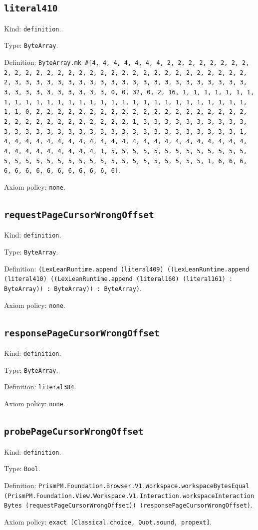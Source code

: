 \documentclass[11pt]{article}
\begin{document}
\subsection*{\texttt{literal410}}
\noindent Kind: \texttt{definition}.\par
\noindent Type: \texttt{ByteArray}.\par
\noindent Definition: \texttt{ByteArray.mk \#[4, 4, 4, 4, 4, 4, 4, 2, 2, 2, 2, 2, 2, 2, 2, 2, 2, 2, 2, 2, 2, 2, 2, 2, 2, 2, 2, 2, 2, 2, 2, 2, 2, 2, 2, 2, 2, 2, 2, 3, 3, 3, 3, 3, 3, 3, 3, 3, 3, 3, 3, 3, 3, 3, 3, 3, 3, 3, 3, 3, 3, 3, 3, 3, 3, 3, 3, 3, 3, 3, 3, 0, 0, 32, 0, 2, 16, 1, 1, 1, 1, 1, 1, 1, 1, 1, 1, 1, 1, 1, 1, 1, 1, 1, 1, 1, 1, 1, 1, 1, 1, 1, 1, 1, 1, 1, 1, 1, 1, 0, 2, 2, 2, 2, 2, 2, 2, 2, 2, 2, 2, 2, 2, 2, 2, 2, 2, 2, 2, 2, 2, 2, 2, 2, 2, 2, 2, 2, 2, 2, 2, 2, 1, 3, 3, 3, 3, 3, 3, 3, 3, 3, 3, 3, 3, 3, 3, 3, 3, 3, 3, 3, 3, 3, 3, 3, 3, 3, 3, 3, 3, 3, 3, 3, 3, 1, 4, 4, 4, 4, 4, 4, 4, 4, 4, 4, 4, 4, 4, 4, 4, 4, 4, 4, 4, 4, 4, 4, 4, 4, 4, 4, 4, 4, 4, 4, 4, 4, 1, 5, 5, 5, 5, 5, 5, 5, 5, 5, 5, 5, 5, 5, 5, 5, 5, 5, 5, 5, 5, 5, 5, 5, 5, 5, 5, 5, 5, 5, 5, 5, 5, 1, 6, 6, 6, 6, 6, 6, 6, 6, 6, 6, 6, 6, 6, 6]}.\par
\noindent Axiom policy: \texttt{none}.\par
\subsection*{\texttt{requestPageCursorWrongOffset}}
\noindent Kind: \texttt{definition}.\par
\noindent Type: \texttt{ByteArray}.\par
\noindent Definition: \texttt{(LexLeanRuntime.append (literal409) ((LexLeanRuntime.append (literal410) ((LexLeanRuntime.append (literal160) (literal161) : ByteArray)) : ByteArray)) : ByteArray)}.\par
\noindent Axiom policy: \texttt{none}.\par
\subsection*{\texttt{responsePageCursorWrongOffset}}
\noindent Kind: \texttt{definition}.\par
\noindent Type: \texttt{ByteArray}.\par
\noindent Definition: \texttt{literal384}.\par
\noindent Axiom policy: \texttt{none}.\par
\subsection*{\texttt{probePageCursorWrongOffset}}
\noindent Kind: \texttt{definition}.\par
\noindent Type: \texttt{Bool}.\par
\noindent Definition: \texttt{PrismPM.Foundation.Browser.V1.Workspace.workspaceBytesEqual (PrismPM.Foundation.View.Workspace.V1.Interaction.workspaceInteractionBytes (requestPageCursorWrongOffset)) (responsePageCursorWrongOffset)}.\par
\noindent Axiom policy: \texttt{exact [Classical.choice, Quot.sound, propext]}.\par
\end{document}
